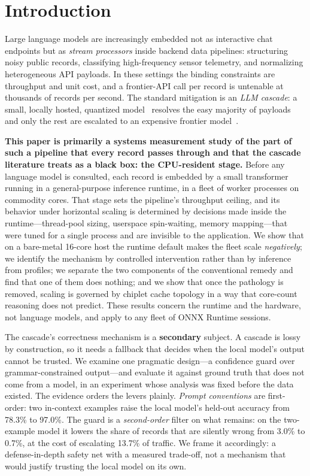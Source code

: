 \documentclass[conference]{IEEEtran}
\begin{document}
\section{Introduction}

Large language models are increasingly embedded not as interactive chat endpoints but as \emph{stream processors} inside backend data pipelines: structuring noisy public records, classifying high-frequency sensor telemetry, and normalizing heterogeneous API payloads. In these settings the binding constraints are throughput and unit cost, and a frontier-API call per record is untenable at thousands of records per second. The standard mitigation is an \emph{LLM cascade}: a small, locally hosted, quantized model~\cite{awq} resolves the easy majority of payloads and only the rest are escalated to an expensive frontier model~\cite{frugalgpt}.

\textbf{This paper is primarily a systems measurement study of the part of such a pipeline that every record passes through and that the cascade literature treats as a black box: the CPU-resident stage.} Before any language model is consulted, each record is embedded by a small transformer running in a general-purpose inference runtime, in a fleet of worker processes on commodity cores. That stage sets the pipeline's throughput ceiling, and its behavior under horizontal scaling is determined by decisions made inside the runtime---thread-pool sizing, userspace spin-waiting, memory mapping---that were tuned for a single process and are invisible to the application. We show that on a bare-metal 16-core host the runtime default makes the fleet scale \emph{negatively}; we identify the mechanism by controlled intervention rather than by inference from profiles; we separate the two components of the conventional remedy and find that one of them does nothing; and we show that once the pathology is removed, scaling is governed by chiplet cache topology in a way that core-count reasoning does not predict. These results concern the runtime and the hardware, not language models, and apply to any fleet of ONNX Runtime sessions.

The cascade's correctness mechanism is a \textbf{secondary} subject. A cascade is lossy by construction, so it needs a fallback that decides when the local model's output cannot be trusted. We examine one pragmatic design---a confidence guard over grammar-constrained output---and evaluate it against ground truth that does not come from a model, in an experiment whose analysis was fixed before the data existed. The evidence orders the levers plainly. \emph{Prompt conventions} are first-order: two in-context examples raise the local model's held-out accuracy from 78.3\% to 97.0\%. The guard is a \emph{second-order} filter on what remains: on the two-example model it lowers the share of records that are silently wrong from 3.0\% to 0.7\%, at the cost of escalating 13.7\% of traffic. We frame it accordingly: a defense-in-depth safety net with a measured trade-off, not a mechanism that would justify trusting the local model on its own.
\end{document}
